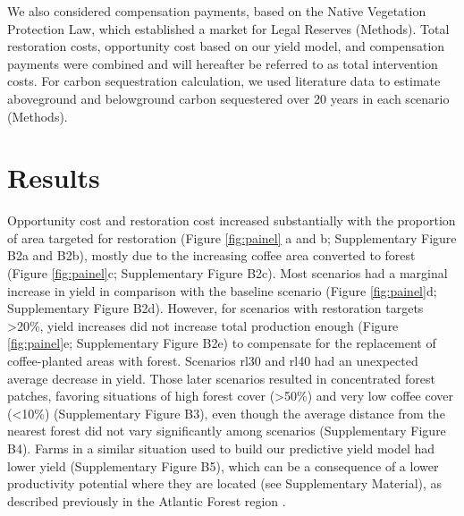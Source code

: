 \documentclass[
	12pt,				%
	oneside,			%
	a4paper,			%
	chapter=TITLE,		%
	section=TITLE,		%
	brazil,			%
	english				%
	]{abntex2}
\begin{document}
We also considered compensation payments, based on the Native Vegetation Protection Law, which established a market for Legal Reserves (Methods). Total restoration costs, opportunity cost based on our yield model, and compensation payments were combined and will hereafter be referred to as total intervention costs. For carbon sequestration calculation, we used literature data to estimate aboveground \autocite{poorter_biomass_2016} and belowground \autocite{zanini_effect_2021} carbon sequestered over 20 years in each scenario (Methods).

\hypertarget{results-1}{%
\section{Results}\label{results-1}}

Opportunity cost and restoration cost increased substantially with the proportion of area targeted for restoration (Figure \ref{fig:painel} a and b; Supplementary Figure B2a and B2b), mostly due to the increasing coffee area converted to forest (Figure \ref{fig:painel}c; Supplementary Figure B2c). Most scenarios had a marginal increase in yield in comparison with the baseline scenario (Figure \ref{fig:painel}d; Supplementary Figure B2d). However, for scenarios with restoration targets \textgreater20\%, yield increases did not increase total production enough (Figure \ref{fig:painel}e; Supplementary Figure B2e) to compensate for the replacement of coffee-planted areas with forest. Scenarios rl30 and rl40 had an unexpected average decrease in yield. Those later scenarios resulted in concentrated forest patches, favoring situations of high forest cover (\textgreater50\%) and very low coffee cover (\textless10\%) (Supplementary Figure B3), even though the average distance from the nearest forest did not vary significantly among scenarios (Supplementary Figure B4). Farms in a similar situation used to build our predictive yield model had lower yield (Supplementary Figure B5), which can be a consequence of a lower productivity potential where they are located (see Supplementary Material), as described previously in the Atlantic Forest region \autocite{gonzalez-chaves_positive_2021}.
\end{document}

